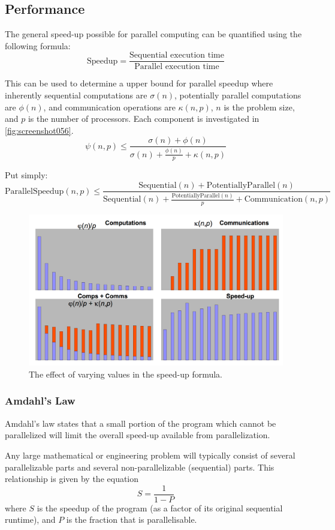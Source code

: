 \subsection{Performance}
The general speed-up possible for parallel computing can be quantified using the following formula:
\[ \text{Speedup} = \frac{\text{Sequential execution time}}{\text{Parallel execution time}} \]

This can be used to determine a upper bound for parallel speedup where inherently sequential computations are $\sigma(n)$, potentially parallel computations are $\phi(n)$, and communication operations are $\kappa(n, p)$, $n$ is the problem size, and $p$ is the number of processors. Each component is investigated in \autoref{fig:screenshot056}.
\[ \psi(n,p) \le \frac{\sigma(n) + \phi(n)}{\sigma(n) + \frac{\phi(n)}{p} + \kappa(n, p)} \]

Put simply:
\[ \text{ParallelSpeedup}(n,p) \le \frac{\text{Sequential}(n) + \text{PotentiallyParallel}(n)}{\text{Sequential}(n) + \frac{\text{PotentiallyParallel}(n)}{p} + \text{Communication}(n, p)} \]

\begin{figure}
\centering
\includegraphics[width=0.7\linewidth]{figures/screenshot056}
\caption{The effect of varying values in the speed-up formula.}
\label{fig:screenshot056}
\end{figure}

\subsubsection{Amdahl's Law}
Amdahl's law states that a small portion of the program which cannot be parallelized will limit the overall speed-up available from parallelization. 

Any large mathematical or engineering problem will typically consist of several parallelizable parts and several non-parallelizable (sequential) parts. This relationship is given by the equation
\[ S = \frac{1}{1 - P} \]
where $S$ is the speedup of the program (as a factor of its original sequential runtime), and $P$ is the fraction that is parallelisable. 

